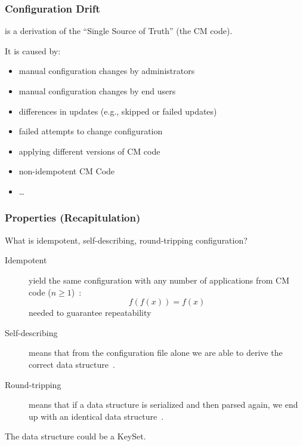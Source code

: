 \begin{frame}
	\frametitle{Configuration Drift}

	\pause

	is a derivation of the ``Single Source of Truth'' (the CM code).

	\vspace{1em}
	It is caused by:

	\begin{itemize} %
	\item manual configuration changes by administrators
	\item manual configuration changes by end users
	\item differences in updates (e.g., skipped or failed updates)
	\item failed attempts to change configuration
	\item applying different versions of CM code
	\item non-idempotent CM Code
	\item \dots
	\end{itemize}
\end{frame}


\begin{frame}
	\frametitle{Properties (Recapitulation)}

	\begin{task}
	What is idempotent, self-describing, round-tripping configuration?
	\end{task}

	\pause


	\begin{description}
	\item[Idempotent]
	yield the same configuration with any number of applications from CM code ($n\ge1$)~\cite{waldemar2013testing}:
	\[
		f(f(x))=f(x)
	\]
	needed to guarantee repeatability

	\item[Self-describing]
	means that from the configuration file alone we are able to derive the correct data structure~\cite{wadler2003xml}.

	\item[Round-tripping]
	means that if a data structure is serialized and then parsed again, we end up with an identical data structure~\cite{wadler2003xml}.
	\end{description}

	The data structure could be a KeySet.
\end{frame}

